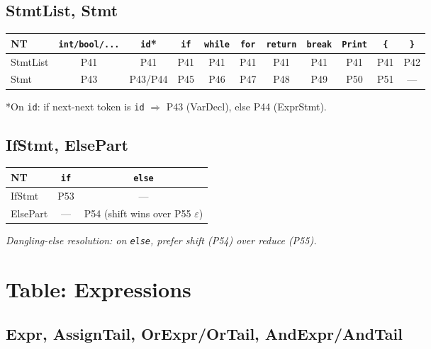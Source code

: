 \documentclass[12pt,a4paper]{article}
\begin{document}
\subsection{StmtList, Stmt}

\begin{center}
\begin{tabular}{l|cccccccccc}
\toprule
NT       & \texttt{int/bool/...} & \texttt{id}* & \texttt{if} & \texttt{while} & \texttt{for} & \texttt{return} & \texttt{break} & \texttt{Print} & \texttt{\{} & \texttt{\}} \\
\midrule
StmtList & P41 & P41 & P41 & P41 & P41 & P41 & P41 & P41 & P41 & P42 \\
Stmt     & P43 & P43/P44 & P45 & P46 & P47 & P48 & P49 & P50 & P51 & — \\
\bottomrule
\end{tabular}
\end{center}

*On \texttt{id}: if next-next token is \texttt{id} $\Rightarrow$ P43 (VarDecl), else P44 (ExprStmt).

\subsection{IfStmt, ElsePart}

\begin{center}
\begin{tabular}{l|cc}
\toprule
NT        & \texttt{if} & \texttt{else} \\
\midrule
IfStmt    & P53 & — \\
ElsePart  & — & P54 (shift wins over P55 $\varepsilon$) \\
\bottomrule
\end{tabular}
\end{center}

\textit{Dangling-else resolution: on \texttt{else}, prefer shift (P54) over reduce (P55).}

\section{Table: Expressions}

\subsection{Expr, AssignTail, OrExpr/OrTail, AndExpr/AndTail}
\end{document}
